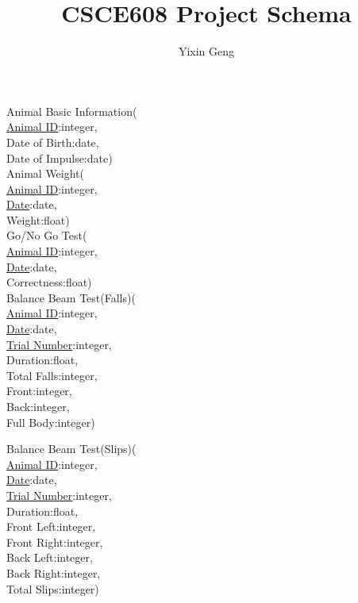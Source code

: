 \documentclass[12pt]{article}
\title{CSCE608 Project Schema}
\author{Yixin Geng}
\date{}
\begin{document}
	\maketitle
	Animal Basic Information(\\
	\indent\indent \underline{Animal ID}:integer,\\
	\indent\indent Date of Birth:date,\\
	\indent\indent Date of Impulse:date)\\
	
	\indent Animal Weight(\\
	\indent\indent \underline{Animal ID}:integer,\\
	\indent\indent \underline{Date}:date,\\
	\indent\indent Weight:float)\\
		
	\indent Go/No Go Test(\\
	\indent\indent \underline{Animal ID}:integer,\\
	\indent\indent \underline{Date}:date,\\
	\indent\indent Correctness:float)\\
	
	\indent Balance Beam Test(Falls)(\\
	\indent\indent \underline{Animal ID}:integer,\\
	\indent\indent \underline{Date}:date,\\
	\indent\indent \underline{Trial Number}:integer,\\
	\indent\indent Duration:float,\\
	\indent\indent Total Falls:integer,\\
	\indent\indent Front:integer,\\
	\indent\indent Back:integer,\\
	\indent\indent Full Body:integer)\\
	
	\newpage
	
	\indent Balance Beam Test(Slips)(\\
	\indent\indent \underline{Animal ID}:integer,\\
	\indent\indent \underline{Date}:date,\\
	\indent\indent \underline{Trial Number}:integer,\\
	\indent\indent Duration:float,\\
	\indent\indent Front Left:integer,\\
	\indent\indent Front Right:integer,\\
	\indent\indent Back Left:integer,\\
	\indent\indent Back Right:integer,\\
	\indent\indent Total Slips:integer)\\
	
\end{document}
